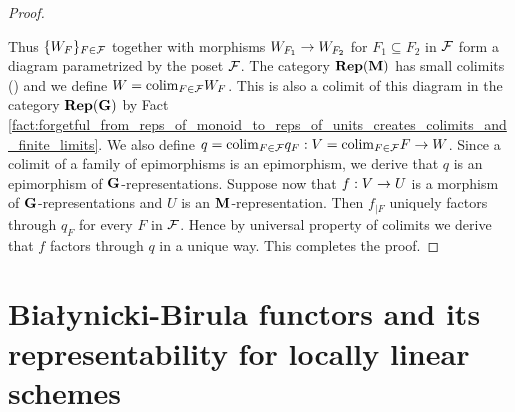 \begin{proof}
\begin{center}
\end{center}
Thus $\{W_F\}_{F\in {\mathcal F}}$ together with morphisms $W_{F_1}\rightarrow W_{F_2}$ for $F_1\subseteq F_2$ in ${\mathcal F}$ form a diagram parametrized by the poset ${\mathcal F}$. The category $\mathbf{Rep}(\mathbf{M})$ has small colimits ({\cite[Corollary 14.5]{Monoid_k_functors}}) and we define $W = \mathrm{colim}_{F\in {\mathcal F}}W_F$. This is also a colimit of this diagram in the category $\mathbf{Rep}(\mathbf{G})$ by Fact \ref{fact:forgetful_from_reps_of_monoid_to_reps_of_units_creates_colimits_and_finite_limits}. We also define $q = \mathrm{colim}_{F\in {\mathcal F}}q_F:V = \mathrm{colim}_{F\in {\mathcal F}}F \rightarrow W$.  Since a colimit of a family of epimorphisms is an epimorphism, we derive that $q$ is an epimorphism of $\mathbf{G}$-representations. Suppose now that $f:V\rightarrow U$ is a morphism of $\mathbf{G}$-representations and $U$ is an $\mathbf{M}$-representation. Then $f_{\mid F}$ uniquely factors through $q_F$ for every $F$ in ${\mathcal F}$. Hence by universal property of colimits we derive that $f$ factors through $q$ in a unique way. This completes the proof.
\end{proof}

\section{Bia{\l}ynicki-Birula functors and its representability for locally linear schemes}




































































\small




